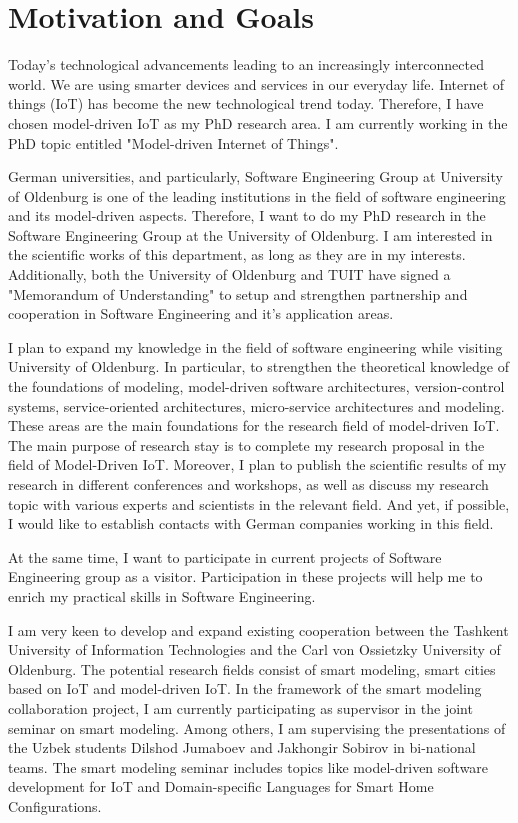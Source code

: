 \documentclass[10pt, oneside]{article}
\begin{document}
\section{Motivation and Goals}
Today’s technological advancements leading to an increasingly interconnected world. We are using smarter devices and services in our everyday life. Internet of things (IoT) has become the new technological trend today. Therefore, I have chosen model-driven IoT as my PhD research area. I am currently working in the PhD topic entitled "Model-driven Internet of Things".

German universities, and particularly, Software Engineering Group at University of Oldenburg is one of the leading institutions in the field of software engineering and its model-driven aspects. Therefore, I want to do my PhD research in the Software Engineering Group at the University of Oldenburg. I am interested in the scientific works of this department, as long as they are in my interests. Additionally, both the University of Oldenburg and TUIT have signed a "Memorandum of Understanding" to setup and strengthen partnership and cooperation in Software 
Engineering and it’s application areas. 

I plan to expand my knowledge in the field of software engineering while visiting University of Oldenburg. In particular, to strengthen the theoretical knowledge of the foundations of modeling, model-driven software architectures, version-control systems, service-oriented architectures, micro-service architectures and modeling. These areas are the main foundations for the research field of model-driven IoT. The main purpose of research stay is to complete my research proposal in the field of Model-Driven IoT. Moreover, I plan to publish the scientific results of my research in different conferences and workshops, as well as discuss my research topic with various experts and scientists in the relevant field. And yet, if possible, I would like to establish contacts with German companies working in this field.

At the same time, I want to participate in current projects of Software Engineering group as a visitor. Participation in these projects will help me to enrich my practical skills in Software Engineering.

I am very keen to develop and expand existing cooperation between the Tashkent University of Information Technologies and the Carl von Ossietzky University of Oldenburg. The potential research fields consist of smart modeling, smart cities based on IoT and model-driven IoT. In the framework of the smart modeling collaboration project, I am currently participating as supervisor in the joint seminar on smart modeling. Among others, I am supervising the presentations of the Uzbek students Dilshod Jumaboev and Jakhongir Sobirov in bi-national teams. The smart modeling seminar includes topics like model-driven software development for IoT and Domain-specific Languages for Smart Home Configurations.
\end{document}

